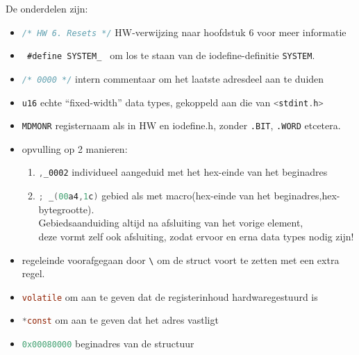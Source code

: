\documentclass[a4paper, 11pt, fleqn, twoside]{scrartcl}%
\begin{document}
De onderdelen zijn:
\begin{itemize}
\item \lstinline[language=C]!/* HW 6. Resets */!
 HW-verwijzing naar hoofdstuk 6 voor meer informatie
\item \lstinline[language=C]! #define SYSTEM_ !
 om los te staan van de iodefine-definitie {\footnotesize\verb|SYSTEM|}.
\item \lstinline[language=C]!/* 0000 */!
 intern commentaar om het laatste adresdeel aan te duiden
\item \lstinline[language=C]$u16$
 echte ``fixed-width'' data types, gekoppeld aan die van
 \lstinline[language=C]|<stdint.h>|
\item \lstinline[language=C]|MDMONR|
  registernaam als in HW en iodefine.h, zonder
  {\footnotesize\verb|.BIT|, \verb|.WORD|} etcetera.
\item opvulling op 2 manieren:
 \begin{enumerate}
 \item \lstinline[language=C]|,_0002|
  individueel aangeduid met het hex-einde van het beginadres
 \item \lstinline[language=C]|; _(00a4,1c)|
  gebied als met macro(hex-einde van het beginadres,hex-bytegrootte).\\
  Gebiedsaanduiding altijd na afsluiting van het vorige element,\\
  deze vormt zelf ook afsluiting, zodat ervoor en erna data types
  nodig zijn!
 \end{enumerate}
\item regeleinde voorafgegaan door \lstinline[language=C]|\| om de struct
  voort te zetten met een extra regel.
\item \lstinline[language=C]|volatile|
 om aan te geven dat de registerinhoud hardwaregestuurd is
\item \lstinline[language=C]|*const| om aan te geven dat het adres vastligt
\item \lstinline[language=C]|0x00080000| beginadres van de structuur
\end{itemize}
\end{document}
